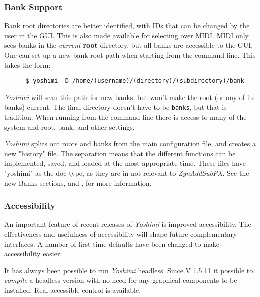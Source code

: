 \documentclass[
 11pt,
 twoside,
 a4paper,
 final                                 %
]{article}
\begin{document}
\subsubsection{Bank Support}
\label{subsubsec:new_features_bank_support}

   Bank root directories are better identified, with IDs that can be changed by
   the user in the GUI. This is also made available for selecting over MIDI.
   MIDI only sees banks in the \textsl{current}
   \textbf{root} directory, but all banks are accessible to the GUI.
   One can set up a new bank root path when starting from the
   command line. This takes the form:

   \begin{verbatim}
      $ yoshimi -D /home/(username)/(directory)/(subdirectory)/bank
   \end{verbatim}

   \textsl{Yoshimi} will scan this path for new banks, but
   won't make the root (or any of its banks) current. The final directory
   doesn't have to be \texttt{banks}, but that is tradition.
   When running from the command line there is access to many
   of the system and root, bank, and other settings.

   \textsl{Yoshimi} splits out roots and banks from the main configuration
   file, and creates a new "history" file. The separation means that the
   different functions can be implemented, saved, and loaded at the most
   appropriate time. These files have "yoshimi" as the doc-type, as they are in
   not relevant to \textsl{ZynAddSubFX}.
   See the new Banks sections,
   and
   ,
   for more information.

\subsubsection{Accessibility}
\label{subsubsec:new_features_accessibility}

   An important feature of recent releases of \textsl{Yoshimi} is improved
   accessibility. The effectiveness and usefulness of accessibility will
   shape future complementary interfaces. A number of first-time defaults
   have been changed to make accessibility easier.

   It has always been possible to run \textsl{Yoshimi} headless. Since V 1.5.11
   it possible to \textsl{compile} a headless version with no need for
   any graphical components to be installed.
   Real accessible control is available.
\end{document}
